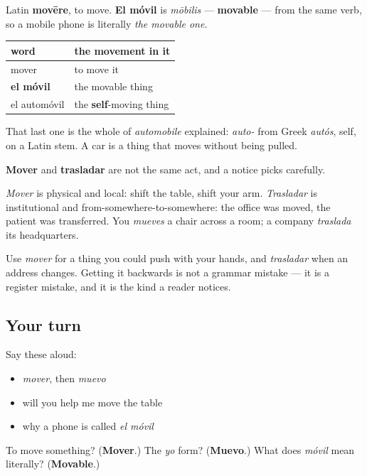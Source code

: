 \begin{cousinweb}
Latin \textbf{movēre}, to move. \textbf{El móvil} is \emph{mōbilis} — \textbf{movable} — from the same verb, so a mobile phone is literally \emph{the movable one}.

\noindent
\begin{tabularx}{\linewidth}{@{}>{\raggedright\arraybackslash}X>{\raggedright\arraybackslash}X@{}}
\toprule
\textbf{word} & \textbf{the movement in it} \\
\midrule
mover & to move it \\
\textbf{el móvil} & the movable thing \\
el automóvil & the \textbf{self}-moving thing \\
\bottomrule
\end{tabularx}

That last one is the whole of \emph{automobile} explained: \emph{auto-} from Greek \emph{autós}, self, on a Latin stem. A car is a thing that moves without being pulled.
\end{cousinweb}

\begin{culture}
\textbf{Mover} and \textbf{trasladar} are not the same act, and a notice picks carefully.

\emph{Mover} is physical and local: shift the table, shift your arm. \emph{Trasladar} is institutional and from-somewhere-to-somewhere: the office was moved, the patient was transferred. You \emph{mueves} a chair across a room; a company \emph{traslada} its headquarters.

Use \emph{mover} for a thing you could push with your hands, and \emph{trasladar} when an address changes. Getting it backwards is not a grammar mistake — it is a register mistake, and it is the kind a reader notices.
\end{culture}

\subsection*{Your turn}
Say these aloud:

\begin{itemize}
\raggedright
  \item \emph{mover}, then \emph{muevo}
  \item will you help me move the table
  \item why a phone is called \emph{el móvil}
\end{itemize}

\begin{tcolorbox}[breakable,colback=teal!4,colframe=teal!35!black,title={Before you move on}]
To move something? (\textbf{Mover}.) The \emph{yo} form? (\textbf{Muevo}.) What does \emph{móvil} mean literally? (\textbf{Movable}.)
\end{tcolorbox}

